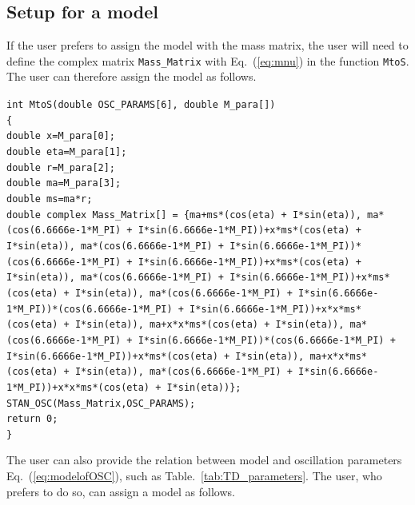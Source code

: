 \documentclass[aps,prd,nofootinbib,preprint]{revtex4}
\begin{document}
\subsection{Setup for a model}\label{sec:ex_set_model}

If the user prefers to assign the model with the mass matrix, the user will need to define the complex matrix \texttt{Mass\_Matrix} with Eq.~(\ref{eq:mnu}) in the function \texttt{MtoS}. The user can therefore assign the model as follows.

\texttt{int MtoS(double OSC\_PARAMS[6],~double M\_para[])}\\
\texttt{\{}
\\        
   \texttt{double x=M\_para[0];}\\
    \texttt{double eta=M\_para[1];}\\
    \texttt{double r=M\_para[2];}\\
    \texttt{double ma=M\_para[3];}\\
    \texttt{double ms=ma*r;}\\
    
    \texttt{double complex Mass\_Matrix[] = \{ma+ms*(cos(eta) + I*sin(eta)), ma*(cos(6.6666e-1*M\_PI) + I*sin(6.6666e-1*M\_PI))+x*ms*(cos(eta) + I*sin(eta)), ma*(cos(6.6666e-1*M\_PI) + I*sin(6.6666e-1*M\_PI))*(cos(6.6666e-1*M\_PI) + I*sin(6.6666e-1*M\_PI))+x*ms*(cos(eta) + I*sin(eta)), ma*(cos(6.6666e-1*M\_PI) + I*sin(6.6666e-1*M\_PI))+x*ms*(cos(eta) + I*sin(eta)), ma*(cos(6.6666e-1*M\_PI) + I*sin(6.6666e-1*M\_PI))*(cos(6.6666e-1*M\_PI) + I*sin(6.6666e-1*M\_PI))+x*x*ms*(cos(eta) + I*sin(eta)), ma+x*x*ms*(cos(eta) + I*sin(eta)), ma*(cos(6.6666e-1*M\_PI) + I*sin(6.6666e-1*M\_PI))*(cos(6.6666e-1*M\_PI) + I*sin(6.6666e-1*M\_PI))+x*ms*(cos(eta) + I*sin(eta)), ma+x*x*ms*(cos(eta) + I*sin(eta)), ma*(cos(6.6666e-1*M\_PI) + I*sin(6.6666e-1*M\_PI))+x*x*ms*(cos(eta) + I*sin(eta))\};}\\
    
    \texttt{STAN\_OSC(Mass\_Matrix,OSC\_PARAMS);}\\
    
    \texttt{return 0;}\\
\texttt{\} }

The user can also provide the relation between model and oscillation parameters Eq.~(\ref{eq:modelofOSC}), such as Table.~\ref{tab:TD_parameters}. The user, who prefers to do so, can assign a model as follows.
\end{document}
